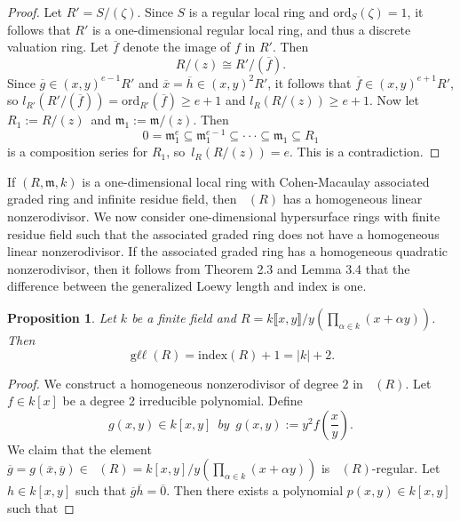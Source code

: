 \documentclass{amsart}
\newtheorem{proposition}[theorem]{Proposition}
\theoremstyle{definition}
\theoremstyle{definition}
\DeclareMathOperator{\gr}{\text{gr}_{\mathfrak{m}}}
\DeclareMathOperator{\gll}{\text{g}\ell\ell}
\numberwithin{equation}{section}
\theoremstyle{definition}
\begin{document}
{\begin{proof}
Let $R'=S/(\zeta)$. Since $S$ is a regular local ring and $\text{ord}_{S}(\zeta)=1$, it follows that $R'$ is a one-dimensional regular local ring, and thus a discrete valuation ring. Let $\overline{f}$ denote the image of $f$ in $R'$. Then 
\[R/(z) \cong R'/(\overline{f}).\]\text{} \newline
Since $\overline{g} \in (x,y)^{e-1}R'$ and $\overline{x}=\overline{h} \in (x,y)^2R'$, it follows that $\overline{f} \in (x,y)^{e+1}R'$, so
$l_{R'}(R'/(\overline{f}))=\text{ord}_{R'}(\overline{f}) \geq e+1$  and  $l_{R}(R/(z)) \geq e+1$. Now let $R_{1}:=R/(z)$\, and $\mathfrak{m}_{1}:=\mathfrak{m}/(z)$.
Then \newline  
\[0=\mathfrak{m}_{1}^{e} \subseteq \mathfrak{m}_{1}^{e-1} \subseteq \cdot\cdot\cdot \subseteq \mathfrak{m}_{1} \subseteq R_{1}\]\text{}\newline is a composition series for $R_{1}$, so\, $l_{R}(R/(z))=e$. This is a contradiction.\end{proof} \text{}\newline 
If $(R,\mathfrak{m},k)$ is a one-dimensional local ring with Cohen-Macaulay associated graded ring and infinite residue field, then $\gr(R)$ has a homogeneous linear nonzerodivisor. We now consider one-dimensional hypersurface rings with finite residue field such that the associated graded ring does not have a homogeneous linear nonzerodivisor. If the associated graded ring has a homogeneous quadratic nonzerodivisor, then it follows from Theorem 2.3 and Lemma 3.4 that the difference between the generalized Loewy length and index is one. \newline 
\begin{proposition} Let $k$ be a finite field and $R=k\llbracket x,y \rrbracket/y(\prod\limits_{\alpha \in k}(x+\alpha y))$. Then \[\gll(R)=\text{index}(R)+1=|k|+2.\] \end{proposition}
\begin{proof} We construct a homogeneous nonzerodivisor of degree $2$ in $\gr(R)$. Let $f \in k[x]$ be a degree 2 irreducible polynomial. Define
\[g(x,y) \in k[x,y] \,\,\,by\,\,\, g(x,y):=y^2f(\frac{x}{y}).\]\text{}\newline
We claim that the element $\overline{g}=g(\overline{x},\overline{y}) \in \gr(R)=k[x,y]/y(\prod\limits_{\alpha \in k}(x+\alpha y))$ is $\gr(R)$-regular. \newline\newline Let $h \in k[x,y]$ such that $\overline{g}\overline{h}=\overline{0}$. Then there exists a polynomial $p(x,y) \in k[x,y]$ such that \newline

\end{proof}}
\end{document}
